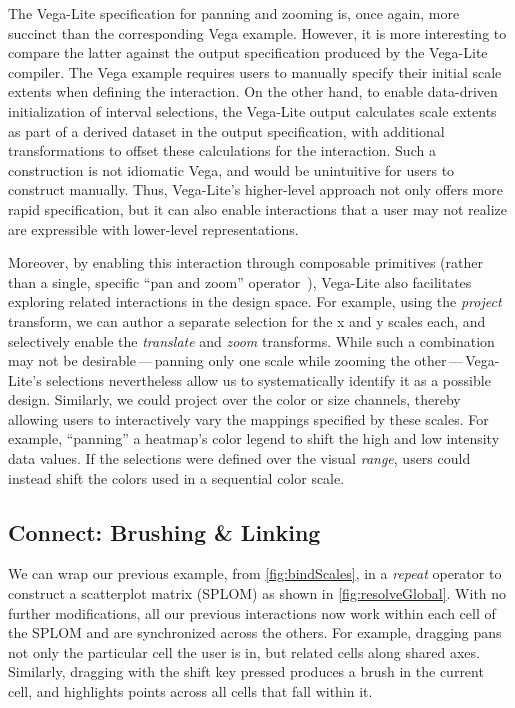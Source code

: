 The Vega-Lite specification for panning and zooming is, once again, more
succinct than the corresponding Vega example. However, it is more interesting to
compare the latter against the output specification produced by the Vega-Lite
compiler. The Vega example requires users to manually specify their initial
scale extents when defining the interaction. On the other hand, to enable
data-driven initialization of interval selections, the Vega-Lite output
calculates scale extents as part of a derived dataset in the output
specification, with additional transformations to offset these calculations for
the interaction. Such a construction is not idiomatic Vega, and would be
unintuitive for users to construct manually. Thus, Vega-Lite's higher-level
approach not only offers more rapid specification, but it can also enable
interactions that a user may not realize are expressible with lower-level
representations.

Moreover, by enabling this interaction through composable primitives (rather
than a single, specific ``pan and zoom'' operator~\cite{bostock:d3}), Vega-Lite
also facilitates exploring related interactions in the design space. For
example, using the \emph{project} transform, we can author a separate selection
for the x and y scales each, and selectively enable the \emph{translate} and
\emph{zoom} transforms. While such a combination may not be
desirable\,---\,panning only one scale while zooming the other\,---\,Vega-Lite's
selections nevertheless allow us to systematically identify it as a possible
design. Similarly, we could project over the color or size channels, thereby
allowing users to interactively vary the mappings specified by these scales. For
example, ``panning'' a heatmap's color legend to shift the high and low
intensity data values. If the selections were defined over the visual
\emph{range}, users could instead shift the colors used in a sequential color
scale.

\subsection{Connect: Brushing \& Linking}

We can wrap our previous example, from \cref{fig:bindScales}, in a \emph{repeat}
operator to construct a scatterplot matrix (SPLOM) as shown in
\cref{fig:resolveGlobal}. With no further modifications, all our previous
interactions now work within each cell of the SPLOM and are synchronized across
the others. For example, dragging pans not only the particular cell the user is
in, but related cells along shared axes. Similarly, dragging with the shift key
pressed produces a brush in the current cell, and highlights points across all
cells that fall within it.

